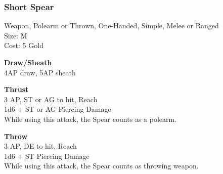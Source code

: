 \subsubsection{Short Spear}\label{weapon:shortSpear}
Weapon, Polearm or Thrown, One-Handed, Simple, Melee or Ranged\\
Size: M\\
Cost: 5 Gold

\textbf{Draw/Sheath}\\
4AP draw, 5AP sheath

\textbf{Thrust}\\
3 AP, ST or AG to hit,  Reach\\
1d6 + \texttimes ST or AG Piercing Damage\\
While using this attack, the Spear counts as a polearm.

\textbf{Throw}\\
3 AP, DE to hit,  Reach\\
1d6 + \texttimes ST Piercing Damage\\
While using this attack, the Spear counts as throwing weapon.

